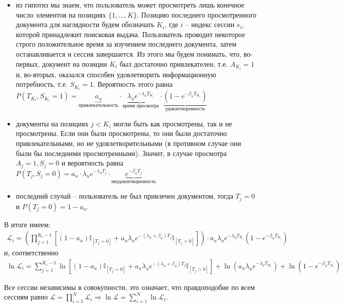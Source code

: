 \documentclass[diploma]{nanolab2015}
\begin{document}
  \begin{itemize}
    \item из гипотиз мы знаем, что пользователь может просмотреть лишь конечное число элементов на позициях $\{1, \dots, K\}$. Позицию последнего просмотренного документа для наглядности будем обозначать $K_i$, где $i$ -- индекс сессии $s_i$, которой принадлежит поисковая выдача. Пользователь проводит некоторое строго положительное время за изучением последнего документа, затем останавливается и сессия завершается. Из этого мы будем понимать, что, во-первых, документ на позиции $K_i$ был достаточно привлекателен, т.е. $A_{K_i} = 1$ и, во-вторых, оказался способен удовлетворить информационную потребность, т.е. $S_{K_i} = 1$. Вероятность этого равна $P(T_{K_i}, S_{K_i} = 1) = \underbrace{a_u}_{\text{привлекательность}} \cdot \underbrace{\lambda_u e^{-\lambda_u T_{K_i}}}_{\text{время просмотра}} \cdot \underbrace{(1 - e^{-\beta_u T_{K_i}})}_{\text{удовлетворенность}}$
    \item документы на позициях $j < K_i$ могли быть как просмотрены, так и не просмотрены. Если они были просмотрены, то они были достаточно привлекательными, но не удовлетворительными (в противном случае они были бы последними просмотренными). Значит, в случае просмотра $A_j = 1, S_j = 0$ и вероятность равна $P(T_j, S_j = 0) = a_u \cdot \lambda_u e^{-\lambda_u T_j} \cdot \underbrace{e^{-\beta_u T_j}}_{\text{неудовлетворенность}}$
    \item последний случай -- пользователь не был привлечен документом, тогда $T_j = 0$ и $P(T_j = 0) = 1 - a_u$.
  \end{itemize}

  В итоге имеем:
  \begin{align}
    \mathcal{L}_i = \left( \prod_{j=1}^{K_i-1} \left[(1-a_u)\mathbb{I}_{[T_j=0]} + a_u \lambda_u e^{-(\lambda_u + \beta_u)T_j} \mathbb{I}_{[T_j > 0]} \right] \right) \cdot a_u \lambda_u e^{-\lambda_u T_{K_i}} (1 - e^{-\beta_u T_{K_i}})
  \end{align}
  и, соответственно
  \begin{align}
    \ln\mathcal{L}_i = \sum_{j=1}^{K_i-1}\ln \left[ (1-a_u)\mathbb{I}_{[T_j=0]} + a_u \lambda_u e^{-(\lambda_u + \beta_u)T_j} \mathbb{I}_{[T_j > 0]} \right] + \ln(a_u\lambda_u e^{-\lambda_u T_{K_i}}) + \ln (1 - e^{-\beta_u T_{K_i}}) \label{mle:2}
  \end{align}

  Все сессии независимы в совокупности, это означает, что правдоподобие по всем сессиям равно $\mathcal{L} = \prod\limits_{i=1}^{N} \mathcal{L}_i \Rightarrow \ln \mathcal{L} = \sum\limits_{i=1}^{N} \ln \mathcal{L}_i$.
\end{document}
